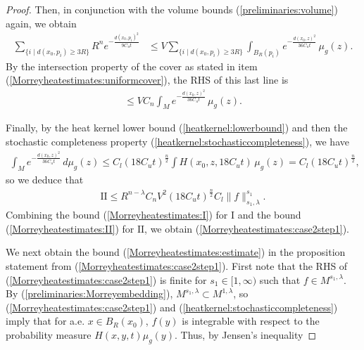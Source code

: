 \documentclass[12pt]{amsart}
\renewcommand{\1}{{\mathbf 1}}
\theoremstyle{others}
\numberwithin{equation}{section}
\begin{document}
\begin{proof}
   Then, in conjunction with the volume bounds (\ref{preliminaries:volume}) again, we obtain
   \begin{align*}
       \sum_{\{i \mid d(x_0, p_i) \geq 3R\}} R^ne^{-\frac{d(x_0, p_i)^2}{9C_u t}} &\leq V \sum_{\{i \mid d(x_0, p_i) \geq 3R\}} \int_{B_R(p_i)} e^{-\frac{d(x_0, z)^2}{36C_u t}} \, \mu_g(z).
   \end{align*} By the intersection property of the cover as stated in item (\ref{Morreyheatestimates:uniformcover}), the RHS of this last line is
   \begin{align*}
       \leq VC_n \int_M e^{-\frac{d(x_0, z)^2}{36C_u t}} \, \mu_g(z).
   \end{align*}

   Finally, by the heat kernel lower bound (\ref{heatkernel:lowerbound}) and then the stochastic completeness property (\ref{heatkernel:stochasticcompleteness}), we have
   \begin{align*}
       \int_M e^{-\frac{d(x_0, z)^2}{36C_u t}} \, d \mu_g(z) \leq C_l(18 C_u t)^{\frac{n}{2}} \int H(x_0, z, 18 C_u t) \, \mu_g(z) =  C_l(18 C_u t)^{\frac{n}{2}},
   \end{align*} so we deduce that
   \begin{align}\label{Morreyheatestimates:II}
       \text{II} \leq R^{n-\lambda}C_nV^2(18C_u t)^{\frac{n}{2}}C_l \|f\|_{s_1, \lambda}^{s_1}.
   \end{align} Combining the bound (\ref{Morreyheatestimates:I}) for \(\text{I}\) and the bound (\ref{Morreyheatestimates:II}) for \(\text{II}\), we obtain (\ref{Morreyheatestimates:case2step1}). \par 
   We next obtain the bound (\ref{Morreyheatestimates:estimate}) in the proposition statement from (\ref{Morreyheatestimates:case2step1}). First note that the RHS of (\ref{Morreyheatestimates:case2step1}) is finite for \(s_1 \in [1, \infty)\) such that \(f \in M^{s_1, \lambda}\). By (\ref{preliminaries:Morreyembedding}), \(M^{s_1, \lambda} \subset M^{1, \lambda}\), so (\ref{Morreyheatestimates:case2step1}) and (\ref{heatkernel:stochasticcompleteness}) imply that for a.e. \(x \in B_R(x_0)\), \(f(y)\) is integrable with respect to the probability measure \(H(x, y, t) \mu_g(y)\). Thus, by Jensen's inequality

\end{proof}
\end{document}
